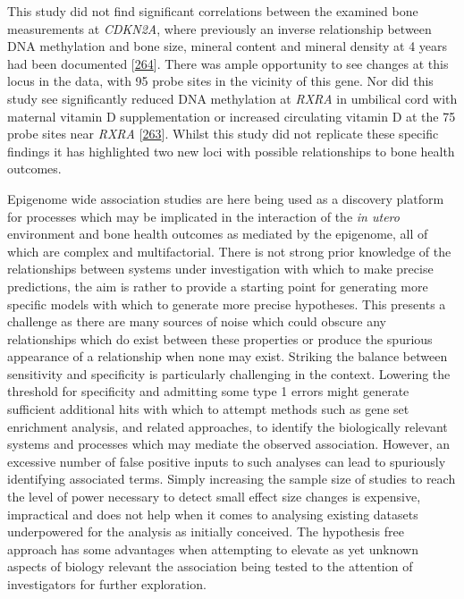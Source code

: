 \documentclass[
]{book}
\begin{document}
This study did not find significant correlations between the examined bone measurements at \emph{CDKN2A}, where previously an inverse relationship between DNA methylation and bone size, mineral content and mineral density at 4 years had been documented {[}\protect\hyperlink{ref-Curtis2017}{264}{]}.
There was ample opportunity to see changes at this locus in the data, with 95 probe sites in the vicinity of this gene.
Nor did this study see significantly reduced DNA methylation at \emph{RXRA} in umbilical cord with maternal vitamin D supplementation or increased circulating vitamin D at the 75 probe sites near \emph{RXRA} {[}\protect\hyperlink{ref-Harvey2014d}{263}{]}.
Whilst this study did not replicate these specific findings it has highlighted two new loci with possible relationships to bone health outcomes.

Epigenome wide association studies are here being used as a discovery platform for processes which may be implicated in the interaction of the \emph{in utero} environment and bone health outcomes as mediated by the epigenome, all of which are complex and multifactorial.
There is not strong prior knowledge of the relationships between systems under investigation with which to make precise predictions, the aim is rather to provide a starting point for generating more specific models with which to generate more precise hypotheses.
This presents a challenge as there are many sources of noise which could obscure any relationships which do exist between these properties or produce the spurious appearance of a relationship when none may exist.
Striking the balance between sensitivity and specificity is particularly challenging in the context.
Lowering the threshold for specificity and admitting some type 1 errors might generate sufficient additional hits with which to attempt methods such as gene set enrichment analysis, and related approaches, to identify the biologically relevant systems and processes which may mediate the observed association.
However, an excessive number of false positive inputs to such analyses can lead to spuriously identifying associated terms.
Simply increasing the sample size of studies to reach the level of power necessary to detect small effect size changes is expensive, impractical and does not help when it comes to analysing existing datasets underpowered for the analysis as initially conceived.
The hypothesis free approach has some advantages when attempting to elevate as yet unknown aspects of biology relevant the association being tested to the attention of investigators for further exploration.
\end{document}
